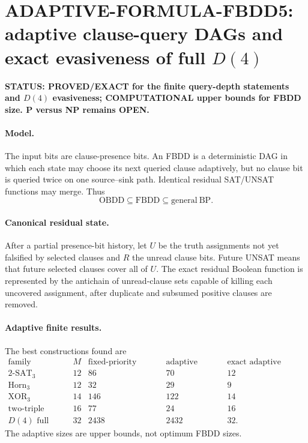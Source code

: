 \section*{ADAPTIVE-FORMULA-FBDD5: adaptive clause-query DAGs and exact evasiveness of full $D(4)$}

\textbf{STATUS: PROVED/EXACT for the finite query-depth statements and $D(4)$ evasiveness; COMPUTATIONAL upper bounds for FBDD size. P versus NP remains OPEN.}

\paragraph{Model.}
The input bits are clause-presence bits. An FBDD is a deterministic DAG in which each state may choose its next queried clause adaptively, but no clause bit is queried twice on one source--sink path. Identical residual SAT/UNSAT functions may merge. Thus
\[
\mathrm{OBDD}\subseteq\mathrm{FBDD}\subseteq\mathrm{general\ BP}.
\]

\paragraph{Canonical residual state.}
After a partial presence-bit history, let $U$ be the truth assignments not yet falsified by selected clauses and $R$ the unread clause bits. Future UNSAT means that future selected clauses cover all of $U$. The exact residual Boolean function is represented by the antichain of unread-clause sets capable of killing each uncovered assignment, after duplicate and subsumed positive clauses are removed.

\paragraph{Adaptive finite results.}
The best constructions found are
\[
\begin{array}{c|r|r|r|r}
\text{family}&M&\text{fixed-priority nodes}&\text{adaptive nodes}&\text{exact adaptive depth}\\
\hline
2\text{-SAT}_3&12&86&70&12\\
\text{Horn}_3&12&32&29&9\\
\text{XOR}_3&14&146&122&14\\
\text{two-triple chain}&16&77&24&16\\
D(4)\text{ full}&32&2438&2432&32.
\end{array}
\]
The adaptive sizes are upper bounds, not optimum FBDD sizes.

